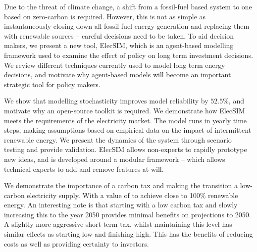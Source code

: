 Due to the threat of climate change, a shift from a fossil-fuel based system to one based on zero-carbon is required. However, this is not as simple as instantaneously closing down all fossil fuel energy generation and replacing them with renewable sources -- careful decisions need to be taken. To aid decision makers, we present a new tool, ElecSIM, which is an agent-based modelling framework used to examine the effect of policy on long term investment decisions. We review different techniques currently used to model long term energy decisions, and motivate why agent-based models will become an important strategic tool for policy makers.

We show that modelling stochasticity improves model reliability by $52.5\%$, and motivate why an open-source toolkit is required. We demonstrate how ElecSIM meets the requirements of the electricity market. The model runs in yearly time steps, making assumptions based on empirical data on the impact of intermittent renewable energy. We present the dynamics of the system through scenario testing and provide validation. ElecSIM allows non-experts to rapidly prototype new ideas, and is developed around a modular framework -- which allows technical experts to add and remove features at will. 


We demonstrate the importance of a carbon tax and making the transition a low-carbon electricity supply. With a value of  to achieve close to 100\% renewable energy. An interesting note is that starting with a low carbon tax and slowly increasing this to the year 2050 provides minimal benefits on projections to 2050. A slightly more aggressive short term tax, whilst maintaining this level has similar effects as starting low and finishing high. This has the benefits of reducing costs as well as providing certainty to investors.
